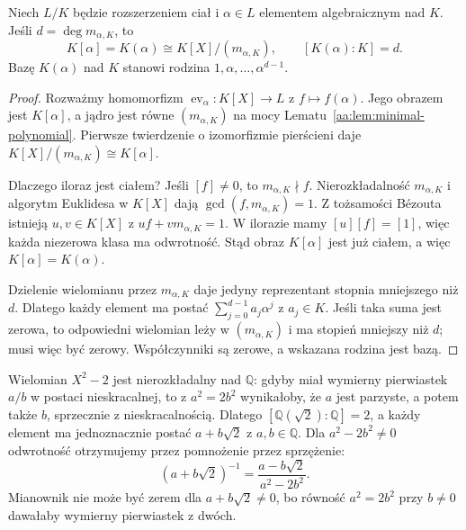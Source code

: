 \begin{twierdzenie}
\label{aa:tw:simple-algebraic-extension}
Niech $L/K$ będzie rozszerzeniem ciał i
$\alpha\in L$ elementem algebraicznym nad $K$.
Jeśli $d=\deg m_{\alpha,K}$, to
\[
K[\alpha]=K(\alpha)\cong K[X]/(m_{\alpha,K}),
\qquad [K(\alpha):K]=d.
\]
Bazę $K(\alpha)$ nad $K$ stanowi rodzina
$1,\alpha,\ldots,\alpha^{d-1}$.
\end{twierdzenie}
\begin{proof}
Rozważmy homomorfizm
$\operatorname{ev}_\alpha:K[X]\to L$ z
$f\mapsto f(\alpha)$. Jego obrazem jest $K[\alpha]$,
a jądro jest równe $(m_{\alpha,K})$ na mocy
Lematu~\ref{aa:lem:minimal-polynomial}.
Pierwsze twierdzenie o izomorfizmie pierścieni daje
$K[X]/(m_{\alpha,K})\cong K[\alpha]$.

Dlaczego iloraz jest ciałem? Jeśli $[f]\ne0$, to
$m_{\alpha,K}\nmid f$. Nierozkładalność $m_{\alpha,K}$
i algorytm Euklidesa w $K[X]$ dają
$\gcd(f,m_{\alpha,K})=1$. Z tożsamości Bézouta
istnieją $u,v\in K[X]$ z
$uf+vm_{\alpha,K}=1$. W ilorazie mamy
$[u][f]=[1]$, więc każda niezerowa klasa ma odwrotność.
Stąd obraz $K[\alpha]$ jest już ciałem, a więc
$K[\alpha]=K(\alpha)$.

Dzielenie wielomianu przez $m_{\alpha,K}$ daje
jedyny reprezentant stopnia mniejszego niż $d$.
Dlatego każdy element ma postać
$\sum_{j=0}^{d-1}a_j\alpha^j$ z $a_j\in K$.
Jeśli taka suma jest zerowa, to odpowiedni wielomian
leży w $(m_{\alpha,K})$ i ma stopień mniejszy niż $d$;
musi więc być zerowy. Współczynniki są zerowe,
a wskazana rodzina jest bazą.
\end{proof}

\begin{przyklad}
\label{aa:prz:sqrt-two-extension}
Wielomian $X^2-2$ jest nierozkładalny nad
$\mathbb Q$: gdyby miał wymierny pierwiastek $a/b$
w postaci nieskracalnej, to z $a^2=2b^2$ wynikałoby,
że $a$ jest parzyste, a potem także $b$, sprzecznie
z nieskracalnością. Dlatego
$[\mathbb Q(\sqrt2):\mathbb Q]=2$, a każdy element
ma jednoznacznie postać $a+b\sqrt2$ z $a,b\in\mathbb Q$.
Dla $a^2-2b^2\ne0$ odwrotność otrzymujemy przez
pomnożenie przez sprzężenie:
\[
(a+b\sqrt2)^{-1}=\frac{a-b\sqrt2}{a^2-2b^2}.
\]
Mianownik nie może być zerem dla $a+b\sqrt2\ne0$,
bo równość $a^2=2b^2$ przy $b\ne0$ dawałaby
wymierny pierwiastek z dwóch.
\end{przyklad}

